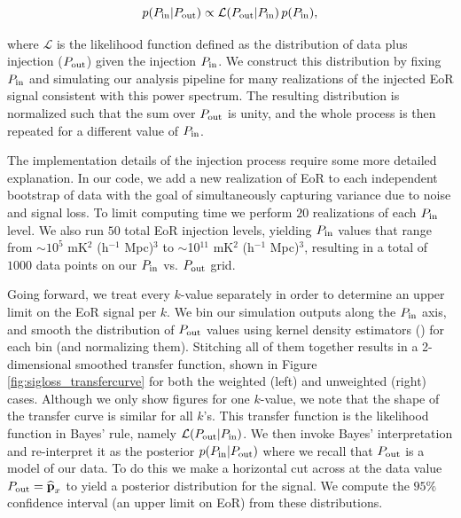 \documentclass[preprint2,numberedappendix,tighten]{aastex6}  %
\begin{document}
\begin{equation}
\label{eq:Bayes}
p(P_{\rm in} | P_{\rm out}) \propto {\mathcal{L} (  P_{\rm out} | P_{\rm in})}\,p(P_{\rm in}) ,
\end{equation}

\noindent where $\mathcal{L} $ is the likelihood function defined 
as the distribution of data plus injection ($P_{\rm out}$) given the injection $P_{\rm in}$.  We construct this distribution  
by fixing $P_{\rm in}$ and simulating our analysis pipeline for many realizations of the injected EoR signal 
consistent with this power spectrum. The resulting distribution is normalized such that the sum over $P_{\rm out}$ is unity, and the 
whole process is then repeated for a different value of $P_{\rm in}$. 


The implementation details of the injection process require some more detailed explanation. In our code, we add a new realization of EoR to each independent bootstrap of data with the goal of simultaneously capturing variance due to noise and signal loss. To limit computing time we perform $20$ realizations of each $P_{\rm in}$ level. We also run $50$ total EoR injection levels, yielding $P_{\rm in}$ values that range from $\sim$$10^{5}$ mK$^{2}$ (h$^{-1}$ Mpc)$^{3}$ to $\sim$10$^{11}$ mK$^{2}$ (h$^{-1}$ Mpc)$^{3}$, resulting in a total of $1000$ data points on our $P_{\rm in}$ vs. $P_{\rm out}$ grid. 

Going forward, we treat every $k$-value separately in order to determine an upper limit on the EoR signal per $k$. We bin our simulation outputs along the $P_{\rm in}$ axis, and smooth the distribution of $P_{\rm out}$ values using kernel density estimators (\citealt{scott2008kernel}) for each bin (and normalizing them). Stitching all of them together results in a 2-dimensional smoothed transfer function, shown in Figure \ref{fig:sigloss_transfercurve} for both the weighted (left) and unweighted (right) cases. Although we only show figures for one $k$-value, we note that 
the shape of the transfer curve is similar for all $k$'s. This transfer function is the likelihood function in Bayes' rule, namely $\mathcal{L} (  P_{\rm out} | P_{\rm in})$.  We then invoke Bayes' interpretation and re-interpret it as the posterior $p(P_{\rm in}|P_{\rm out})$ where we recall that $P_{\rm out}$ is a model of our data. To do this we make a horizontal cut across at the data value $P_{\rm out} = \widehat{\textbf{p}}_{x}$ to yield a posterior distribution for the signal. We compute the $95\%$ confidence interval (an upper limit on EoR) from these distributions.
\end{document}
